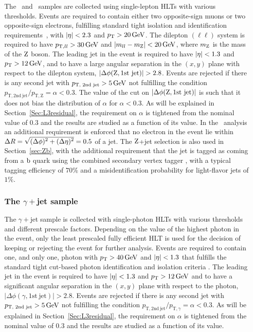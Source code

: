\documentclass[11pt,twoside,a4paper,cmspaper,final,collab]{cms-tdr}
\begin{document}
The \zmmjet~and \zeejet~samples are collected using single-lepton HLTs
with various \pt thresholds.
Events are required to contain either two opposite-sign muons or two opposite-sign electrons, fulfilling standard tight isolation and identification requirements~\cite{cmsmuons,Khachatryan:2015hwa}, with $\lvert \eta \rvert<2.3$ and $p_{\mathrm{T}}>20\,\text{Ge\hspace{-.08em}V}$.
The dilepton $(\ell\ell)$ system is required to have $p_{\mathrm{T}, ll}>30\,\text{Ge\hspace{-.08em}V}$ and $|m_{ll}-m_\mathrm{Z}|<20\,\text{Ge\hspace{-.08em}V}$, where $m_\mathrm{Z}$ is the mass of the $\mathrm{Z}$ boson. The leading jet in the event
is required to have $\lvert \eta \rvert<1.3$ and $p_{\mathrm{T}}>12\,\text{Ge\hspace{-.08em}V}$, and to have a large angular separation in the $(x,y)$
plane with respect to the dilepton system, $|\Delta\phi(\rm Z,1st~jet)|>2.8$.
Events are rejected if there is any second jet with $p_\text{T, 2nd jet}>5\,\text{Ge\hspace{-.08em}V}$ not fulfilling the condition $p_\mathrm{T,2nd~jet}/p_\mathrm{T, Z}=\alpha<0.3$. The value of the cut on $|\Delta\phi(\rm Z,1st~jet)|$ is such that it does not bias the distribution of $\alpha$ for $\alpha<0.3$.
As will be explained in Section~\ref{Sec:L3residual}, the requirement on $\alpha$ is tightened from the nominal value of $0.3$ and the results
are studied as a function of its value. In the \zeejet~analysis
an additional requirement is enforced that no electron in the event lie within $\Delta R=\sqrt{\smash[b]{(\Delta\phi)^2+(\Delta\eta)^2}}=0.5$ of a jet.
The $\mathrm{Z}$+jet selection is also used in Section~\ref{sec:Zb}, with the additional requirement that the jet is tagged as coming from a $\mathrm{b}$ quark using the combined secondary vertex tagger \cite{btag}, with a typical tagging efficiency of $70\%$ and a misidentification probability for light-flavor jets of $1\%$.

\subsubsection*{The $\gamma +$jet sample}
The $\gamma +$jet sample is collected with single-photon HLTs with various \pt thresholds and different prescale factors.
Depending on the value of the highest photon \pt in the event, only the least prescaled fully efficient HLT is used for the decision of keeping or rejecting the event for further analysis.
Events are required to contain one, and only one, photon with $p_{\mathrm{T}}>40\,\text{Ge\hspace{-.08em}V}$ and $\lvert \eta \rvert<1.3$ that fulfills
the standard tight cut-based photon identification and isolation criteria \cite{Khachatryan:2015iwa}.
The leading jet in the event is required to have $\lvert \eta \rvert<1.3$ and $p_{\mathrm{T}}>12\,\text{Ge\hspace{-.08em}V}$ and to have a significant angular separation in the $(x,y)$
plane with respect to the photon, $|\Delta\phi(\gamma,\mathrm{1st~jet})|>2.8$.
Events are rejected if there is any second jet with $p_\text{T, 2nd jet}>5\,\text{Ge\hspace{-.08em}V}$ not fulfilling the condition $p_\mathrm{T,2nd~jet}/p_{\mathrm{T}, \gamma}=\alpha<0.3$.
As will be explained in Section~\ref{Sec:L3residual}, the requirement on $\alpha$ is tightened from the nominal value of $0.3$ and the results
are studied as a function of its value.
\end{document}

